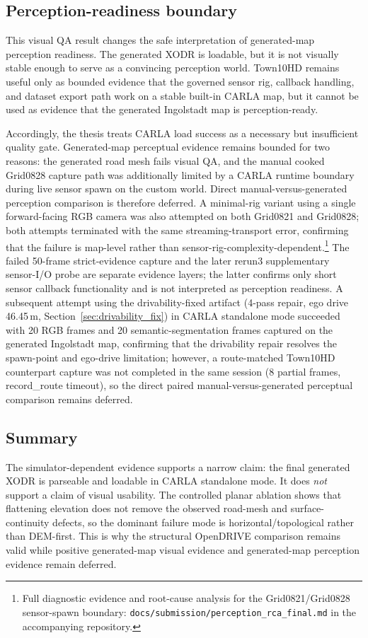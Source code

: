\subsection{Perception-readiness boundary}
This visual QA result changes the safe interpretation of generated-map perception readiness. The generated XODR is loadable, but it is not visually stable enough to serve as a convincing perception world. Town10HD remains useful only as bounded evidence that the governed sensor rig, callback handling, and dataset export path work on a stable built-in CARLA map, but it cannot be used as evidence that the generated Ingolstadt map is perception-ready.

Accordingly, the thesis treats CARLA load success as a necessary but insufficient quality gate. Generated-map perceptual evidence remains bounded for two reasons: the generated road mesh fails visual QA, and the manual cooked Grid0828 capture path was additionally limited by a CARLA runtime boundary during live sensor spawn on the custom world. Direct manual-versus-generated perception comparison is therefore deferred. A minimal-rig variant using a single forward-facing RGB camera was also attempted on both Grid0821 and Grid0828; both attempts terminated with the same streaming-transport error, confirming that the failure is map-level rather than sensor-rig-complexity-dependent.\footnote{Full diagnostic evidence and root-cause analysis for the Grid0821/Grid0828 sensor-spawn boundary: \texttt{docs/submission/perception\_rca\_final.md} in the accompanying repository.} The failed 50-frame strict-evidence capture and the later rerun3 supplementary sensor-I/O probe are separate evidence layers; the latter confirms only short sensor callback functionality and is not interpreted as perception readiness. A subsequent attempt using the drivability-fixed artifact (4-pass repair, ego drive 46.45\,m, Section~\ref{sec:drivability_fix}) in CARLA standalone mode succeeded with 20 RGB frames and 20 semantic-segmentation frames captured on the generated Ingolstadt map, confirming that the drivability repair resolves the spawn-point and ego-drive limitation; however, a route-matched Town10HD counterpart capture was not completed in the same session (8 partial frames, record\_route timeout), so the direct paired manual-versus-generated perceptual comparison remains deferred.

\subsection{Summary}
The simulator-dependent evidence supports a narrow claim: the final generated XODR is parseable and loadable in CARLA standalone mode. It does \emph{not} support a claim of visual usability. The controlled planar ablation shows that flattening elevation does not remove the observed road-mesh and surface-continuity defects, so the dominant failure mode is horizontal/topological rather than DEM-first. This is why the structural OpenDRIVE comparison remains valid while positive generated-map visual evidence and generated-map perception evidence remain deferred.

